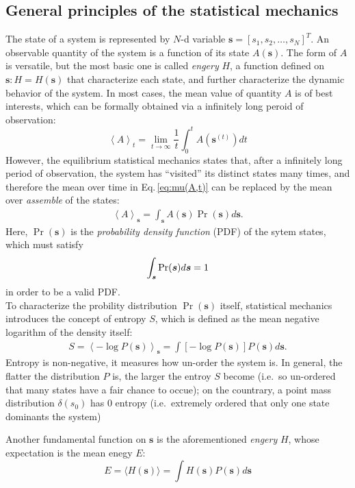 \documentclass[11pt]{article}
\numberwithin{equation}{section}
\newcommand{\bs}{\boldsymbol}
\newcommand{\mean}[2]{\left\langle{#1}\right\rangle_{#2}}
\newcommand{\vs}{\bs{s}}
\newcommand{\ev}[1]{\langle #1 \rangle}
\begin{document}
\subsection{General principles of the statistical mechanics}
The state of a system is represented by $N$-d variable $\vs=[s_1, s_2, \dots, s_N]^T$. An observable quantity of the system is a function of its state $A(\vs)$. The form of $A$ is versatile, but the most basic one is called \textit{engery} $H$, a function defined on $\vs: H = H(\vs)$ that characterize each state, and further characterize the dynamic behavior of the system. In most cases, the mean value of quantity $A$ is of best interests, which can be formally obtained via a infinitely long peroid of observation:
\begin{equation} %
  \mean{A}{t} = \lim_{t \to \infty}\frac{1}{t} \int_0^t A(\vs^{(t)})  dt
\end{equation}
However, the equilibrium statistical mechanics states that, after a infinitely long period of observation, the system has ``visited'' its distinct states many times, and therefore the mean over time in Eq.\,\eqref{eq:mu(A,t)} can be replaced by the mean over \textit{assemble} of the states:
\begin{align}\label{eq:mu(A,s)}
  \mean{A}{\vs} = \int_{\vs} A(\vs)\Pr(\vs) d\vs.
\end{align}
Here, $\Pr(\vs)$ is the \textit{probability density function} (PDF) of the sytem states, which must satisfy
\begin{align}\label{eq:int_s{p(s)}==1}
  \int_{\vs} \Pr(\vs) d\vs = 1
\end{align}
in order to be a valid PDF. \\
To characterize the probility distribution $\Pr(\vs)$ itself, statistical mechanics introduces the concept of entropy $S$, which is defined as the mean negative logarithm of the density itself:
\begin{align}
  S = \mean{-\log{P(\vs)}}{\vs} = \int{[-\log{P(\vs)}]P(\vs)d\vs}.
\end{align}
Entropy is non-negative, it measures how un-order the system is. In general, the flatter the distribution $P$ is, the larger the entroy $S$ become (i.e.\, so un-ordered that many states have a fair chance to occue); on the countrary, a point mass distribution $\delta(s_0)$ has 0 entropy (i.e.\, extremely ordered that only one state dominants the system)

Another fundamental function on $\vs$ is the aforementioned \textit{engery} $H$, whose expectation is the mean enegy $E$:
\[ E = \ev{H(\vs)} = \int{H(\vs)P(\vs)d\vs} \]
\end{document}
